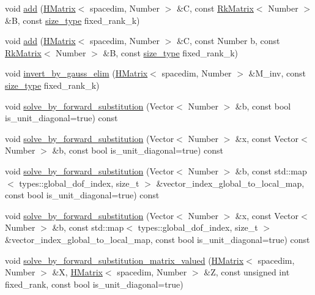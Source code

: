 \begin{DoxyCompactItemize}
\item 
void \hyperlink{classHMatrix_a403d72a5eea3912d67fd0807ddd0baf8}{add} (\hyperlink{classHMatrix}{H\+Matrix}$<$ spacedim, Number $>$ \&C, const \hyperlink{classRkMatrix}{Rk\+Matrix}$<$ Number $>$ \&B, const \hyperlink{classHMatrix_a5ca8dc549783d38371a01ecd621ecb34}{size\+\_\+type} fixed\+\_\+rank\+\_\+k)
\item 
void \hyperlink{classHMatrix_af66071b53145fe007ac040fa0c4b47c6}{add} (\hyperlink{classHMatrix}{H\+Matrix}$<$ spacedim, Number $>$ \&C, const Number b, const \hyperlink{classRkMatrix}{Rk\+Matrix}$<$ Number $>$ \&B, const \hyperlink{classHMatrix_a5ca8dc549783d38371a01ecd621ecb34}{size\+\_\+type} fixed\+\_\+rank\+\_\+k)
\item 
void \hyperlink{classHMatrix_af972cb62d436b8dca5d95a5b6e2ed964}{invert\+\_\+by\+\_\+gauss\+\_\+elim} (\hyperlink{classHMatrix}{H\+Matrix}$<$ spacedim, Number $>$ \&M\+\_\+inv, const \hyperlink{classHMatrix_a5ca8dc549783d38371a01ecd621ecb34}{size\+\_\+type} fixed\+\_\+rank\+\_\+k)
\item 
void \hyperlink{classHMatrix_aeee2443c3f85cd6a961e77e5287e43f9}{solve\+\_\+by\+\_\+forward\+\_\+substitution} (Vector$<$ Number $>$ \&b, const bool is\+\_\+unit\+\_\+diagonal=true) const
\item 
void \hyperlink{classHMatrix_a4c226aaa96ad7b1a7f0c1507d43bba89}{solve\+\_\+by\+\_\+forward\+\_\+substitution} (Vector$<$ Number $>$ \&x, const Vector$<$ Number $>$ \&b, const bool is\+\_\+unit\+\_\+diagonal=true) const
\item 
void \hyperlink{classHMatrix_a898ed2cdcb0351a6a9b57251320b5d1d}{solve\+\_\+by\+\_\+forward\+\_\+substitution} (Vector$<$ Number $>$ \&b, const std\+::map$<$ types\+::global\+\_\+dof\+\_\+index, size\+\_\+t $>$ \&vector\+\_\+index\+\_\+global\+\_\+to\+\_\+local\+\_\+map, const bool is\+\_\+unit\+\_\+diagonal=true) const
\item 
void \hyperlink{classHMatrix_a5ddd48bc33e45d0b4221416cbb039cc3}{solve\+\_\+by\+\_\+forward\+\_\+substitution} (Vector$<$ Number $>$ \&x, const Vector$<$ Number $>$ \&b, const std\+::map$<$ types\+::global\+\_\+dof\+\_\+index, size\+\_\+t $>$ \&vector\+\_\+index\+\_\+global\+\_\+to\+\_\+local\+\_\+map, const bool is\+\_\+unit\+\_\+diagonal=true) const
\item 
void \hyperlink{classHMatrix_a20fa0ad9c55bb5225440ccab58608cf8}{solve\+\_\+by\+\_\+forward\+\_\+substitution\+\_\+matrix\+\_\+valued} (\hyperlink{classHMatrix}{H\+Matrix}$<$ spacedim, Number $>$ \&X, \hyperlink{classHMatrix}{H\+Matrix}$<$ spacedim, Number $>$ \&Z, const unsigned int fixed\+\_\+rank, const bool is\+\_\+unit\+\_\+diagonal=true)

\end{DoxyCompactItemize}

